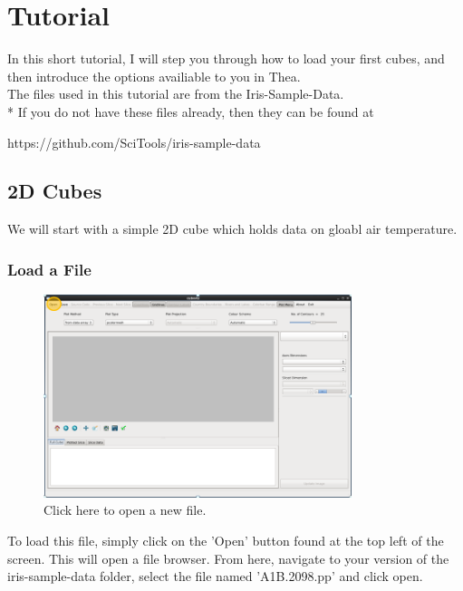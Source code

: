 \documentclass[a4paper,12pt]{article}
\begin{document}
\pagebreak

\section{Tutorial}

In this short tutorial, I will step you through how to load your first cubes,
\vspace{4mm}and then introduce the options availiable to you in Thea. \\
\vspace{4mm}The files used in this tutorial are from the Iris-Sample-Data. \\*
If you do not have these files already, then they can be found at

https://github.com/SciTools/iris-sample-data

\subsection{2D Cubes}

We will start with a simple 2D cube which holds data on gloabl air temperature.

\subsubsection{Load a File}

\begin{figure}[H]
\centering{}
\includegraphics[width=90mm]{resources/tute1.PNG}
\caption{Click here to open a new file.}
\label{overflow}
\end{figure}

To load this file, simply click on the 'Open' button found at the top left
of the screen. This will open a file browser. From here, navigate to your
version of the iris-sample-data folder, select the file named
'A1B.2098.pp' and click open.
\end{document}
